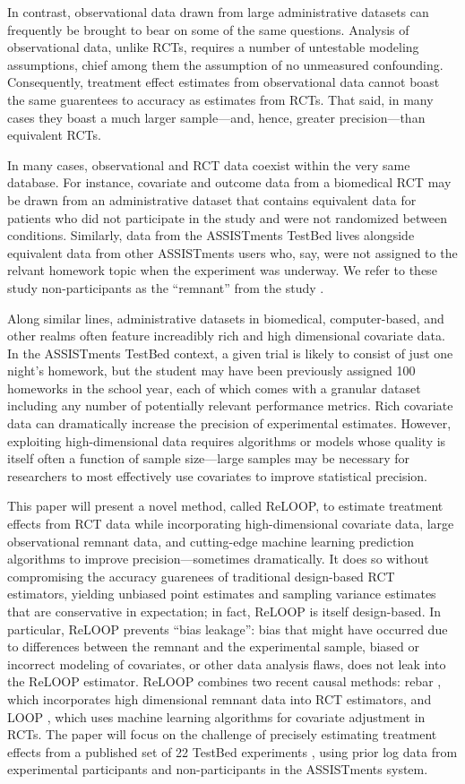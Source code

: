 In contrast, observational data drawn from large administrative
datasets can frequently be brought to bear on some of the same
questions.
Analysis of observational data, unlike RCTs, requires a number of
untestable modeling assumptions, chief among them the assumption of no
unmeasured confounding.
Consequently, treatment effect estimates from observational data
cannot boast the same guarentees to accuracy as estimates from RCTs.
That said, in many cases they boast a much larger sample---and, hence,
greater precision---than equivalent RCTs.

In many cases, observational and RCT data coexist within the very same
database.
For instance, covariate and outcome data from a biomedical RCT may be
drawn from an administrative dataset that contains equivalent data for
patients who did not participate in the study and were not randomized
between conditions.
Similarly, data from the ASSISTments TestBed lives alongside
equivalent data from other ASSISTments users who, say, were not
assigned to the relvant homework topic when the experiment was
underway.
We refer to these study non-participants as the ``remnant'' from the
study \citep[c.f.][]{rebarPaper}.

Along similar lines, administrative datasets in biomedical,
computer-based, and other realms often feature increadibly rich and
high dimensional covariate data.
In the ASSISTments TestBed context, a given
trial is likely to consist of just one night’s homework, but the
student may have been previously assigned 100 homeworks in the school
year, each of which comes with a granular dataset including any number
of potentially relevant performance metrics.
Rich covariate data can dramatically increase the precision of
experimental estimates.
However, exploiting high-dimensional data requires algorithms or
models whose quality is itself often a function of sample size---large
samples may be necessary for researchers to most effectively use
covariates to improve statistical precision.

This paper will present a novel method, called ReLOOP, to estimate
treatment effects
from  RCT data while incorporating high-dimensional covariate data,
large observational remnant data, and cutting-edge machine learning
prediction algorithms to improve precision---sometimes dramatically.
It does so without compromising the accuracy guarenees of traditional
design-based RCT estimators, yielding unbiased point estimates and
sampling variance estimates that are conservative in expectation; in
fact, ReLOOP is itself design-based.
In particular, ReLOOP prevents ``bias leakage'': bias that might have
occurred due to differences between the remnant and the experimental
sample, biased or incorrect modeling of covariates, or other data
analysis flaws, does not leak into the ReLOOP estimator.
ReLOOP combines two recent causal methods: rebar \citep{rebarEDM,jreeTestBed},
which incorporates high dimensional remnant data into RCT estimators,
and LOOP \citep{loop}, which uses machine learning algorithms for
covariate adjustment in RCTs.
The paper will focus on the challenge of precisely estimating
treatment effects from a published set of 22 TestBed experiments \citep{testbed},
using prior log data from experimental participants and
non-participants in the ASSISTments system.

